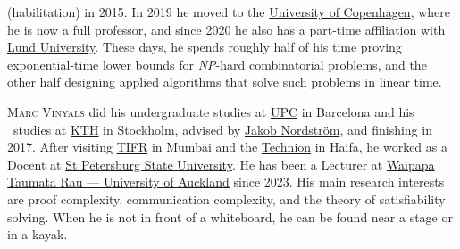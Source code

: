 \documentclass{toc}
\begin{document}
\begin{tocaboutauthors}
\begin{tocabout}[nordstrom]
(habilitation) in 2015. In 2019 he moved to the \href{https://ku.dk}{University of
Copenhagen}, where he is now a full professor, and since 2020 he also has
a part-time affiliation with \href{https://lu.se}{Lund University}.
%
%
%
%
%
%
  These days, he spends roughly half of his time proving
  exponential-time lower bounds for \emph{NP}-hard combinatorial problems,
  and the other half designing applied algorithms that solve such
  problems in linear time.
\end{tocabout}
\begin{tocabout}[vinyals] %
%
%
%
%
  \textsc{Marc Vinyals} did his undergraduate studies at \href{https://fme.upc.edu}{UPC} in Barcelona and his \phd\ studies at
  \href{http://www.csc.kth.se/}{KTH} in Stockholm, advised by
  \href{http://www.jakobnordstrom.se/}{Jakob Nordström}, and finishing in 2017. After
  visiting \href{http://www.tcs.tifr.res.in/}{TIFR} in Mumbai and
  the \href{http://cs.technion.ac.il/}{Technion} in
  Haifa, he worked as a Docent at \href{https://math-cs.spbu.ru/}{St Petersburg State University}. He has been a Lecturer at \href{https://www.cs.auckland.ac.nz/}{Waipapa Taumata Rau --- University of Auckland} since 2023.
%
  His main research interests are proof complexity,
  communication complexity, and the theory of satisfiability solving.
  When he is not in front of a whiteboard, 
  he can be found near a stage or %
  in a kayak. %
\end{tocabout}
\end{tocaboutauthors}
\end{document}
